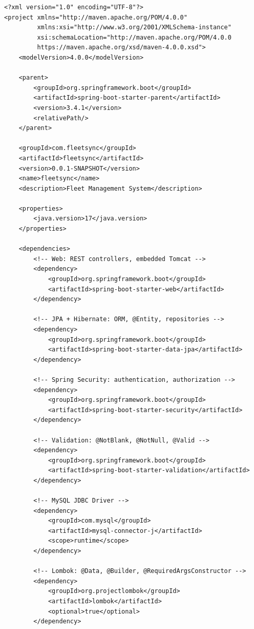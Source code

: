\documentclass[12pt,a4paper]{report}
\begin{document}
\begin{lstlisting}[style=xmlstyle,caption=Complete pom.xml]
<?xml version="1.0" encoding="UTF-8"?>
<project xmlns="http://maven.apache.org/POM/4.0.0"
         xmlns:xsi="http://www.w3.org/2001/XMLSchema-instance"
         xsi:schemaLocation="http://maven.apache.org/POM/4.0.0
         https://maven.apache.org/xsd/maven-4.0.0.xsd">
    <modelVersion>4.0.0</modelVersion>

    <parent>
        <groupId>org.springframework.boot</groupId>
        <artifactId>spring-boot-starter-parent</artifactId>
        <version>3.4.1</version>
        <relativePath/>
    </parent>

    <groupId>com.fleetsync</groupId>
    <artifactId>fleetsync</artifactId>
    <version>0.0.1-SNAPSHOT</version>
    <name>fleetsync</name>
    <description>Fleet Management System</description>

    <properties>
        <java.version>17</java.version>
    </properties>

    <dependencies>
        <!-- Web: REST controllers, embedded Tomcat -->
        <dependency>
            <groupId>org.springframework.boot</groupId>
            <artifactId>spring-boot-starter-web</artifactId>
        </dependency>

        <!-- JPA + Hibernate: ORM, @Entity, repositories -->
        <dependency>
            <groupId>org.springframework.boot</groupId>
            <artifactId>spring-boot-starter-data-jpa</artifactId>
        </dependency>

        <!-- Spring Security: authentication, authorization -->
        <dependency>
            <groupId>org.springframework.boot</groupId>
            <artifactId>spring-boot-starter-security</artifactId>
        </dependency>

        <!-- Validation: @NotBlank, @NotNull, @Valid -->
        <dependency>
            <groupId>org.springframework.boot</groupId>
            <artifactId>spring-boot-starter-validation</artifactId>
        </dependency>

        <!-- MySQL JDBC Driver -->
        <dependency>
            <groupId>com.mysql</groupId>
            <artifactId>mysql-connector-j</artifactId>
            <scope>runtime</scope>
        </dependency>

        <!-- Lombok: @Data, @Builder, @RequiredArgsConstructor -->
        <dependency>
            <groupId>org.projectlombok</groupId>
            <artifactId>lombok</artifactId>
            <optional>true</optional>
        </dependency>


\end{lstlisting}
\end{document}
